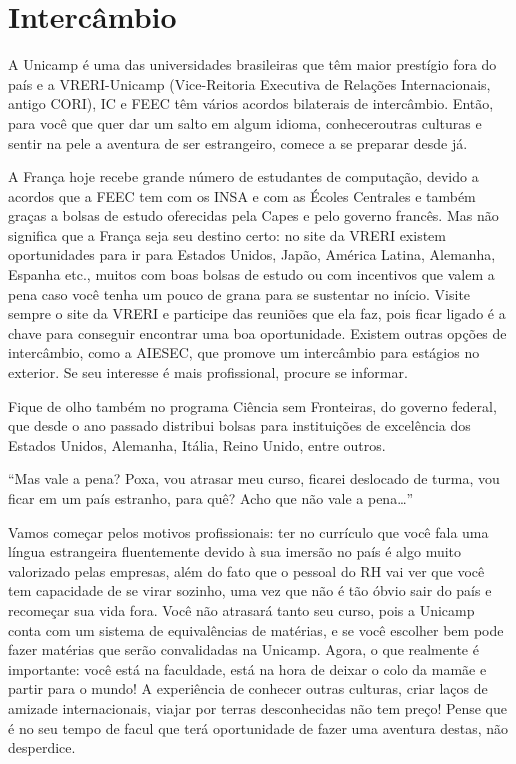 
\section{Intercâmbio}

A Unicamp é uma das universidades brasileiras que têm maior prestígio fora do
país e a VRERI-Unicamp (Vice-Reitoria Executiva de Relações Internacionais,
antigo CORI), IC e FEEC têm vários acordos bilaterais de intercâmbio. Então,
para você que quer dar um salto em algum idioma, conheceroutras culturas e
sentir na pele a aventura de ser estrangeiro, comece a se preparar desde já.

A França hoje recebe grande número de estudantes de computação, devido a acordos
que a FEEC tem com os INSA e com as Écoles Centrales e também graças a bolsas de
estudo oferecidas pela Capes e pelo governo francês. Mas não significa que a
França seja seu destino certo: no site da VRERI existem oportunidades para ir
para Estados Unidos, Japão, América Latina, Alemanha, Espanha etc., muitos com
boas bolsas de estudo ou com incentivos que valem a pena caso você tenha um
pouco de grana para se sustentar no início. Visite sempre o site da VRERI e
participe das reuniões que ela faz, pois ficar ligado é a chave para conseguir
encontrar uma boa oportunidade. Existem outras opções de intercâmbio, como a
AIESEC, que promove um intercâmbio para estágios no exterior. Se seu interesse é
mais profissional, procure se informar.

Fique de olho também no programa Ciência sem Fronteiras, do governo federal, que
desde o ano passado distribui bolsas para instituições de excelência dos Estados
Unidos, Alemanha, Itália, Reino Unido, entre outros.

``Mas vale a pena? Poxa, vou atrasar meu curso, ficarei deslocado de turma, vou
ficar em um país estranho, para quê? Acho que não vale a pena{\dots}''

Vamos começar pelos motivos profissionais: ter no currículo que você fala uma
língua estrangeira fluentemente devido à sua imersão no país é algo muito
valorizado pelas empresas, além do fato que o pessoal do RH vai ver que você tem
capacidade de se virar sozinho, uma vez que não é tão óbvio sair do país e
recomeçar sua vida fora. Você não atrasará tanto seu curso, pois a Unicamp conta
com um sistema de equivalências de matérias, e se você escolher bem pode fazer
matérias que serão convalidadas na Unicamp. Agora, o que realmente é importante:
você está na faculdade, está na hora de deixar o colo da mamãe e partir para o
mundo! A experiência de conhecer outras culturas, criar laços de amizade
internacionais, viajar por terras desconhecidas não tem preço! Pense que é no
seu tempo de facul que terá oportunidade de fazer uma aventura destas, não
desperdice.

